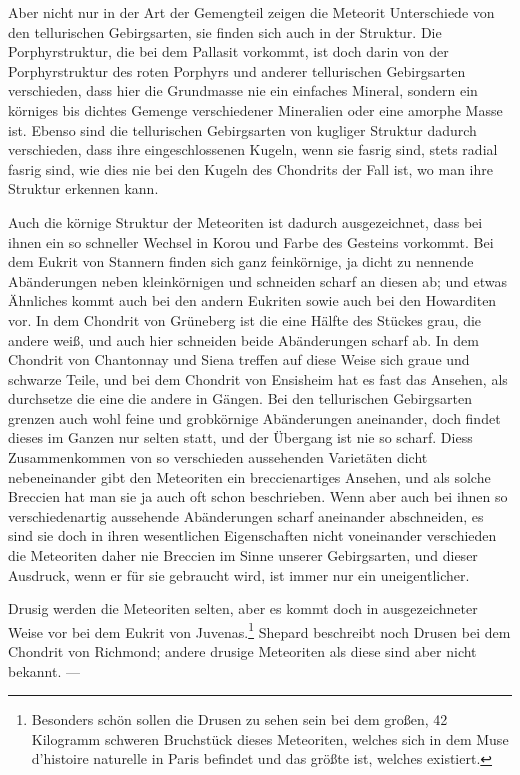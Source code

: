 \documentclass[a4paper, 11pt, oneside]{article}
\begin{document}
Aber nicht nur in der Art der Gemengteil zeigen die Meteorit Unterschiede von den tellurischen Gebirgsarten, sie finden sich auch in der Struktur. Die Porphyrstruktur, die bei dem Pallasit vorkommt, ist doch darin von der Porphyrstruktur des roten Porphyrs und anderer tellurischen Gebirgsarten verschieden, dass hier die Grundmasse nie ein einfaches Mineral, sondern ein körniges bis dichtes Gemenge verschiedener Mineralien oder eine amorphe Masse ist. Ebenso sind die tellurischen Gebirgsarten von kugliger Struktur dadurch verschieden, dass ihre eingeschlossenen Kugeln, wenn sie fasrig sind, stets radial fasrig sind, wie dies nie bei den Kugeln des Chondrits der Fall ist, wo man ihre Struktur erkennen kann.

Auch die körnige Struktur der Meteoriten ist dadurch ausgezeichnet, dass bei ihnen ein so schneller Wechsel in Korou und Farbe des Gesteins vorkommt. Bei dem Eukrit von Stannern finden sich ganz feinkörnige, ja dicht zu nennende Abänderungen neben kleinkörnigen und schneiden scharf an diesen ab; und etwas Ähnliches kommt auch bei den andern Eukriten sowie auch bei den Howarditen vor. In dem Chondrit von Grüneberg ist die eine Hälfte des Stückes grau, die andere weiß, und auch hier schneiden beide Abänderungen scharf ab. In dem Chondrit von Chantonnay und Siena treffen auf diese Weise sich graue und schwarze Teile, und bei dem Chondrit von Ensisheim hat es fast das Ansehen, als durchsetze die eine die andere in Gängen. Bei den tellurischen Gebirgsarten grenzen auch wohl feine und grobkörnige Abänderungen aneinander, doch findet dieses im Ganzen nur selten statt, und der Übergang ist nie so scharf. Diess Zusammenkommen von so verschieden aussehenden Varietäten dicht nebeneinander gibt den Meteoriten ein breccienartiges Ansehen, und als solche Breccien hat man sie ja auch oft schon beschrieben. Wenn aber auch bei ihnen so verschiedenartig aussehende Abänderungen scharf aneinander abschneiden, es sind sie doch in ihren wesentlichen Eigenschaften nicht voneinander verschieden die Meteoriten daher nie Breccien im Sinne unserer Gebirgsarten, und dieser Ausdruck, wenn er für sie gebraucht wird, ist immer nur ein uneigentlicher.

Drusig werden die Meteoriten selten, aber es kommt doch in ausgezeichneter Weise vor bei dem Eukrit von Juvenas.\footnote{Besonders schön sollen die Drusen zu sehen sein bei dem großen, 42 Kilogramm schweren Bruchstück dieses Meteoriten, welches sich in dem Muse d'histoire naturelle in Paris befindet und das größte ist, welches existiert.} Shepard beschreibt noch Drusen bei dem Chondrit von Richmond; andere drusige Meteoriten als diese sind aber nicht bekannt. ---
\end{document}
